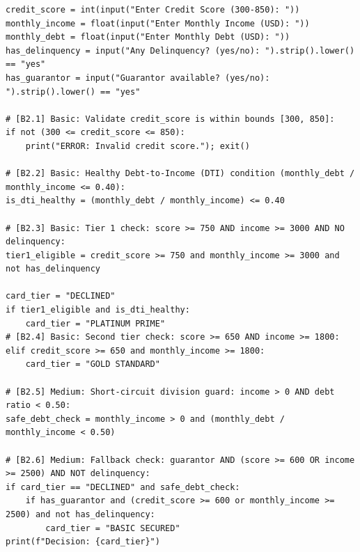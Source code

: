 \documentclass[11pt,a4paper]{article}
\begin{document}
\begin{lstlisting}
credit_score = int(input("Enter Credit Score (300-850): "))
monthly_income = float(input("Enter Monthly Income (USD): "))
monthly_debt = float(input("Enter Monthly Debt (USD): "))
has_delinquency = input("Any Delinquency? (yes/no): ").strip().lower() == "yes"
has_guarantor = input("Guarantor available? (yes/no): ").strip().lower() == "yes"

# [B2.1] Basic: Validate credit_score is within bounds [300, 850]:
if not (300 <= credit_score <= 850):
    print("ERROR: Invalid credit score."); exit()

# [B2.2] Basic: Healthy Debt-to-Income (DTI) condition (monthly_debt / monthly_income <= 0.40):
is_dti_healthy = (monthly_debt / monthly_income) <= 0.40

# [B2.3] Basic: Tier 1 check: score >= 750 AND income >= 3000 AND NO delinquency:
tier1_eligible = credit_score >= 750 and monthly_income >= 3000 and not has_delinquency

card_tier = "DECLINED"
if tier1_eligible and is_dti_healthy:
    card_tier = "PLATINUM PRIME"
# [B2.4] Basic: Second tier check: score >= 650 AND income >= 1800:
elif credit_score >= 650 and monthly_income >= 1800:
    card_tier = "GOLD STANDARD"

# [B2.5] Medium: Short-circuit division guard: income > 0 AND debt ratio < 0.50:
safe_debt_check = monthly_income > 0 and (monthly_debt / monthly_income < 0.50)

# [B2.6] Medium: Fallback check: guarantor AND (score >= 600 OR income >= 2500) AND NOT delinquency:
if card_tier == "DECLINED" and safe_debt_check:
    if has_guarantor and (credit_score >= 600 or monthly_income >= 2500) and not has_delinquency:
        card_tier = "BASIC SECURED"
print(f"Decision: {card_tier}")
\end{lstlisting}
\end{document}
